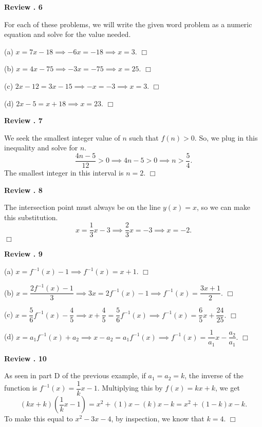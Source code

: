 \documentclass[lang=en,11pt]{elegantbook}
\begin{document}
\noindent \textbf{Review . 6}

For each of these problems, we will write the given word problem as a numeric equation and solve for the value needed.

(a) $\displaystyle x=7x-18 \implies -6x=-18 \implies \boxed{x=3}.$ $\Box$\vspace{3mm}

(b) $\displaystyle x=4x-75 \implies -3x=-75 \implies \boxed{x=25}.$ $\Box$\vspace{3mm}

(c) $\displaystyle 2x-12=3x-15 \implies -x=-3 \implies \boxed{x=3}.$ $\Box$\vspace{3mm}

(d) $\displaystyle 2x-5=x+18 \implies \boxed{x=23}.$ $\Box$\vspace{3mm}

\noindent \textbf{Review . 7}

We seek the smallest integer value of $n$ such that $f(n)>0$.  So, we plug in this inequality and solve for $n$.  $$\dfrac{4n-5}{12}>0 \implies 4n-5>0 \implies n>\dfrac{5}{4}.$$  The smallest integer in this interval is $\boxed{n=2}.$ $\Box$ \vspace{3mm}

\noindent \textbf{Review . 8}

The intersection point must always be on the line $y(x)=x$, so we can make this substitution.  $$x=\dfrac{1}{3}x-3 \implies \dfrac{2}{3}x=-3 \implies \boxed{x=-2}.$$ $\Box$\vspace{3mm}

\noindent \textbf{Review . 9}

(a) $x=f^{-1}(x)-1 \implies f^{-1}(x)=\boxed{x+1}.$ $\Box$\vspace{3mm}

(b) $x=\dfrac{2f^{-1}(x)-1}{3} \implies 3x=2f^{-1}(x)-1\implies f^{-1}(x)=\boxed{\dfrac{3x+1}{2}}.$ $\Box$\vspace{3mm}

(c) $x=\dfrac{5}{6}f^{-1}(x)-\dfrac{4}{5}\implies x+\dfrac{4}{5}=\dfrac{5}{6}f^{-1}(x) \implies f^{-1}(x)=\boxed{\dfrac{6}{5}x+\dfrac{24}{25}}.$ $\Box$\vspace{3mm}

(d) $x=a_1f^{-1}(x)+a_2 \implies x-a_2=a_1f^{-1}(x)\implies f^{-1}(x)=\boxed{\dfrac{1}{a_1}x-\dfrac{a_2}{a_1}}.$ $\Box$\vspace{3mm}

\noindent \textbf{Review . 10}

As seen in part D of the previous example, if $a_1=a_2=k$, the inverse of the function is $f^{-1}(x)=\dfrac{1}{k}x-1.$  Multiplying this by $f(x)=kx+k$, we get $$\left(kx+k\right)\left(\dfrac{1}{k}x-1\right)=x^2+\left(1\right)x-(k)x-k=x^2+(1-k)x-k.$$
To make this equal to $x^2-3x-4$, by inspection, we know that $\boxed{k=4}$. $\Box$\vspace{3mm}
\end{document}
